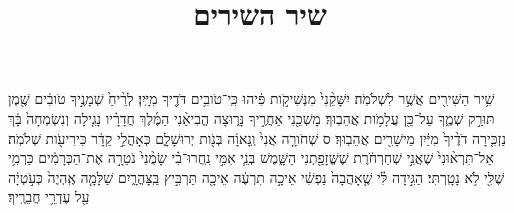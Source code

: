 \documentclass{openreader}
\title{שיר השירים}
\date{}
\begin{document}
\maketitle
\raggedbottom 
\fontsize{16pt}{24pt}\selectfont


שִׁ֥יר הַשִּׁירִ֖ים אֲשֶׁ֥ר לִשְׁלֹמֹֽה׃ 
יִשָּׁקֵ֨נִי֙ מִנְּשִׁיקֹ֣ות פִּ֔יהוּ כִּֽי־טֹובִ֥ים דֹּדֶ֖יךָ מִיָּֽיִן׃ 
לְרֵ֨יחַ֙ שְׁמָנֶ֣יךָ טֹובִ֔ים שֶׁ֖מֶן תּוּרַ֣ק שְׁמֶ֑ךָ עַל־כֵּ֖ן עֲלָמֹ֥ות אֲהֵבֽוּךָ׃ 
מָשְׁכֵ֖נִי אַחֲרֶ֣יךָ נָּר֑וּצָה הֱבִיאַ֨נִי הַמֶּ֜לֶךְ חֲדָרָ֗יו נָגִ֤ילָה וְנִשְׂמְחָה֙ בָּ֔ךְ נַזְכִּ֤ירָה דֹדֶ֨יךָ֙ מִיַּ֔יִן מֵישָׁרִ֖ים אֲהֵבֽוּךָ׃ ס 
שְׁחֹורָ֤ה אֲנִי֙ וְֽנָאוָ֔ה בְּנֹ֖ות יְרוּשָׁלִָ֑ם כְּאָהֳלֵ֣י קֵדָ֔ר כִּירִיעֹ֖ות שְׁלֹמֹֽה׃ 
אַל־תִּרְא֨וּנִי֙ שֶׁאֲנִ֣י שְׁחַרְחֹ֔רֶת שֶׁשֱּׁזָפַ֖תְנִי הַשָּׁ֑מֶשׁ בְּנֵ֧י אִמִּ֣י נִֽחֲרוּ־בִ֗י שָׂמֻ֨נִי֙ נֹטֵרָ֣ה אֶת־הַכְּרָמִ֔ים כַּרְמִ֥י שֶׁלִּ֖י לֹ֥א נָטָֽרְתִּי׃ 
הַגִּ֣ידָה לִּ֗י שֶׁ֤אָהֲבָה֙ נַפְשִׁ֔י אֵיכָ֣ה תִרְעֶ֔ה אֵיכָ֖ה תַּרְבִּ֣יץ בַּֽצָּהֳרָ֑יִם שַׁלָּמָ֤ה אֶֽהְיֶה֙ כְּעֹ֣טְיָ֔ה עַ֖ל עֶדְרֵ֥י חֲבֵרֶֽיךָ׃ 
\end{document}
